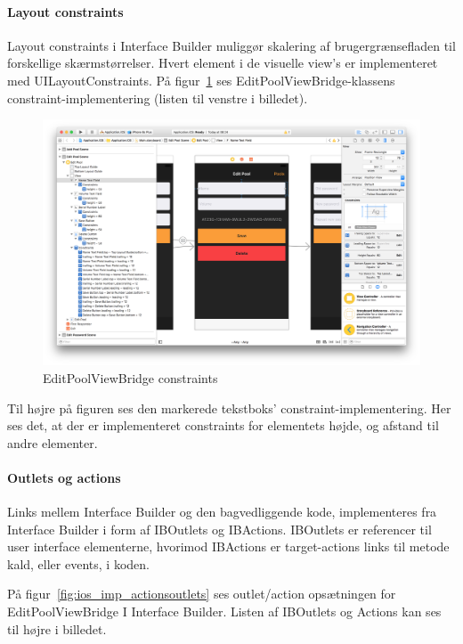 \paragraph{Layout constraints}
Layout constraints i Interface Builder muliggør skalering af brugergrænsefladen til forskellige skærmstørrelser. Hvert element i de visuelle view's er implementeret med UILayoutConstraints. På figur~\ref{fig:ios_imp_constraints} ses EditPoolViewBridge-klassens constraint-implementering (listen til venstre i billedet).

\begin{figure}
	\centering
	\includegraphics[width=1.0\linewidth]{figs/implementering/ios_imp_constraints}
	\caption{EditPoolViewBridge constraints}
	\label{fig:ios_imp_constraints}
\end{figure}

Til højre på figuren ses den markerede tekstboks' constraint-implementering. Her ses det, at der er implementeret constraints for elementets højde, og afstand til andre elementer.

\paragraph{Outlets og actions}
Links mellem Interface Builder og den bagvedliggende kode, implementeres fra Interface Builder i form af IBOutlets og IBActions. IBOutlets er referencer til user interface elementerne, hvorimod IBActions er target-actions links til metode kald, eller events, i koden.

På figur~\ref{fig:ios_imp_actionsoutlets} ses outlet/action opsætningen for EditPoolViewBridge I Interface Builder. Listen af IBOutlets og Actions kan ses til højre i billedet.


